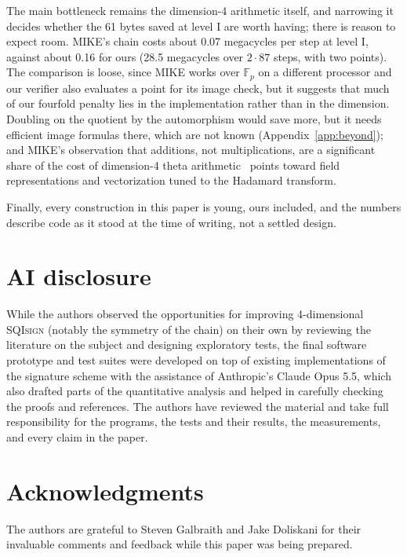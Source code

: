 \documentclass[version=preprint]{iacrcc}
\newif\ifanon
\newcommand{\SQIsign}{SQI{\textsc{sign}}}
\begin{document}
    The main bottleneck remains the dimension-4 arithmetic itself, and
    narrowing it decides whether the 61 bytes saved at level I are worth
    having; there is reason to expect room. MIKE's chain costs about 0.07 megacycles per step
    at level I, against about 0.16 for ours (28.5 megacycles over $2 \cdot
    87$ steps, with two points). The comparison is loose, since MIKE works over $\mathbb{F}_p$
    on a different processor and our verifier also evaluates a point for its
    image check, but it suggests that much of our fourfold penalty lies in the
    implementation rather than in the dimension. Doubling on the quotient by
    the automorphism would save more, but it needs efficient image formulas
    there, which are not known (Appendix~\ref{app:beyond}); and MIKE's
    observation that additions, not
    multiplications, are a significant share of the cost of dimension-4 theta
    arithmetic~\cite[Section 6]{BDD+26} points toward field representations
    and vectorization tuned to the Hadamard transform.

    Finally, every construction in this paper is young, ours included, and the
    numbers describe code as it stood at the time of writing, not a settled design.

\section*{AI disclosure}
    While the authors observed the opportunities for improving 4-dimensional {\SQIsign} (notably the symmetry of the chain) on their own by reviewing the literature on the subject and designing exploratory tests, the final software prototype and test suites were developed on top of existing implementations of the signature scheme with the assistance of Anthropic's Claude Opus 5.5, which also drafted parts of the quantitative analysis and helped in carefully checking the proofs and references.
    The authors have reviewed the material and take full responsibility for the programs, the tests and their results, the measurements, and every claim in the paper.

    \ifanon\else
    \section*{Acknowledgments}
    The authors are grateful to Steven Galbraith and Jake Doliskani for their invaluable comments and feedback while this paper was being prepared.
    \fi

    
\end{document}
